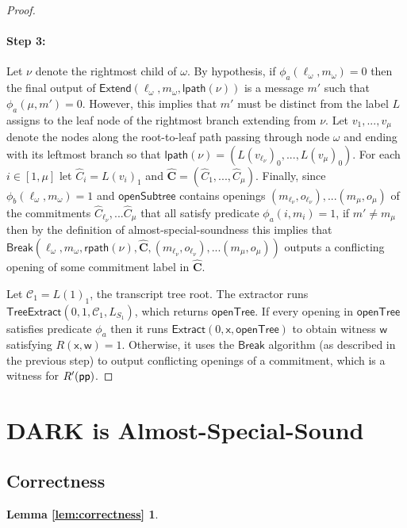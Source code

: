 \begin{proof}
\paragraph{Step 3:}  Let $\nu$ denote the rightmost child of $\omega$. By hypothesis, if $\phi_a(\ell_\omega, m_\omega) = 0$ then the final output of $\textsf{Extend}(\ell_\omega, m_\omega, \textsf{lpath}(\nu))$ is a message $m'$ such that $\phi_a(\mu, m') = 0$. However, this implies that $m'$ must be distinct from the label $L$ assigns to the leaf node of the rightmost branch extending from $\nu$. Let $v_1,...,v_\mu$ denote the nodes along the root-to-leaf path passing through node $\omega$ and ending with its leftmost branch so that $\textsf{lpath}(\nu) = (L(v_{\ell_\nu})_0,...,L(v_\mu)_0)$. For each $i \in [1, \mu]$ let $\hat{C}_i = L(v_i)_1$ and $\mathbf{\hat{C}} = (\hat{C}_1,...,\hat{C}_\mu)$. Finally, since $\phi_b(\ell_\omega, m_\omega) = 1$ and $\textsf{openSubtree}$ contains openings $(m_{\ell_\nu}, o_{\ell_\nu}),...(m_\mu, o_\mu)$ of the commitments $\hat{C}_{\ell_\nu},...\hat{C}_\mu$ that all satisfy predicate $\phi_a(i, m_i) = 1$, if $m' \neq m_\mu$ then by the definition of almost-special-soundness this implies that $\textsf{Break}(\ell_\omega, m_\omega,  \textsf{rpath}(\nu), \mathbf{\hat{C}}, (m_{\ell_\nu}, o_{\ell_\nu}),...(m_{\mu}, o_{\mu}))$ outputs a conflicting opening of some commitment label in $\mathbf{\hat{C}}$. 




Let $\mathcal{C}_1 = L(1)_1$, the transcript tree root. The extractor runs $\textsf{TreeExtract}(0, 1, \mathcal{C}_1, L_{S_1})$, which returns $\textsf{openTree}$. If every opening in $\textsf{openTree}$ satisfies predicate $\phi_a$ then it runs $\textsf{Extract}(0, \mathsf{x}, \textsf{openTree})$ to obtain witness $\mathsf{w}$ satisfying $R(\mathsf{x}, \mathsf{w}) = 1$. Otherwise, it uses the $\textsf{Break}$ algorithm (as described in the previous step) to output conflicting openings of a commitment, which is a witness for $R'(\textsf{pp})$.
	
\end{proof}

\section{DARK is Almost-Special-Sound}
\label{appendix:darkisdark}

\subsection{Correctness}
\label{sec:darkcorrectness}
\def\thelemma{\ref{lem:correctness}}
\newtheorem*{lemmacorrectness}{Lemma \ref{lem:correctness}}
\begin{lemmacorrectness}
	\correctnesslemma
\end{lemmacorrectness}

